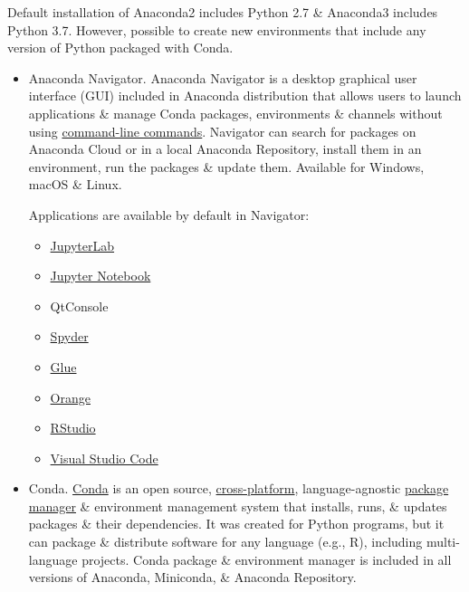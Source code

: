 \documentclass{article}
\begin{document}
Default installation of Anaconda2 includes Python 2.7 \& Anaconda3 includes Python 3.7. However, possible to create new environments that include any version of Python packaged with Conda.
\begin{itemize}
	\item {\sf Anaconda Navigator.} Anaconda Navigator is a desktop graphical user interface (GUI) included in Anaconda distribution that allows users to launch applications \& manage Conda packages, environments \& channels without using \href{https://en.wikipedia.org/wiki/Command-line_interface}{command-line commands}. Navigator can search for packages on Anaconda Cloud or in a local Anaconda Repository, install them in an environment, run the packages \& update them. Available for Windows, macOS \& Linux.
	
	Applications are available by default in Navigator:
	\begin{itemize}
		\item \href{https://en.wikipedia.org/wiki/Project_Jupyter#JupyterLab}{JupyterLab}
		\item \href{https://en.wikipedia.org/wiki/Project_Jupyter#Jupyter_Notebook}{Jupyter Notebook}
		\item QtConsole
		\item \href{https://en.wikipedia.org/wiki/Spyder_(software)}{Spyder}
		\item \href{https://en.wikipedia.org/wiki/Glue_(software)}{Glue}
		\item \href{https://en.wikipedia.org/wiki/Orange_(software)}{Orange}
		\item \href{https://en.wikipedia.org/wiki/RStudio}{RStudio}
		\item \href{https://en.wikipedia.org/wiki/Visual_Studio_Code}{Visual Studio Code}
	\end{itemize}
	\item {\sf Conda.} \href{https://en.wikipedia.org/wiki/Conda_(package_manager)}{Conda} is an open source, \href{https://en.wikipedia.org/wiki/Cross-platform}{cross-platform}, language-agnostic \href{https://en.wikipedia.org/wiki/Package_manager}{package manager} \& environment management system that installs, runs, \& updates packages \& their dependencies. It was created for Python programs, but it can package \& distribute software for any language (e.g., R), including multi-language projects. Conda package \& environment manager is included in all versions of Anaconda, Miniconda, \& Anaconda Repository.
\end{itemize}
\end{document}
